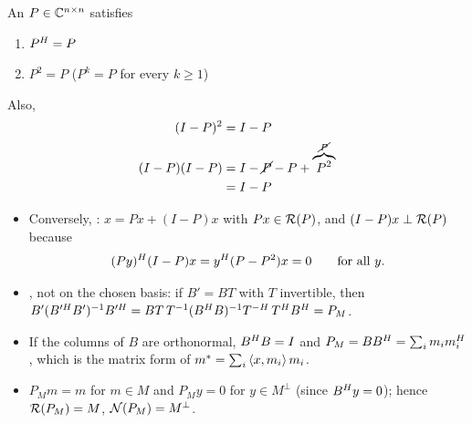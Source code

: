 \begin{remark}
An  $P\in\mathbb{C}^{n\times n}$ satisfies
\begin{enumerate}[label=\roman*-), nosep]
  \item $P^{H} = P$
  \item $P^2 = P$ \quad ($P^k = P$ for every $k\ge 1$)
\end{enumerate}
Also,
\begin{align*}
(I-P)^2 &= I-P\\
(I-P)(I-P) &= I-\cancel{P}-P+\overbrace{P^2}^{\cancel{P}}\\
&= I-P
\end{align*}
\end{remark}
\begin{insight}[Remarks on $P_M$]
\begin{itemize}[nosep]
  \item Conversely, :
        $x = Px + (I-P)x$ with $Px\in\mathcal{R}(P)$, and $(I-P)x\perp\mathcal{R}(P)$ because
        \[
        (Py)^{H}(I-P)x = y^{H}(P-P^2)x = 0 \qquad\text{for all } y.
        \]
  \item {}, not on the chosen basis: if $B' = BT$ with $T$ invertible, then
        $B'(B'^H B')^{-1}B'^H = BT\,T^{-1}(B^{H} B)^{-1}T^{-H}\,T^{H} B^{H} = P_M$.
  \item If the columns of $B$ are orthonormal, $B^{H} B = I$ and $P_M = BB^{H} = \sum_i m_i m_i^{H}$,
        which is the matrix form of $m^* = \sum_i\left\langle x, m_i \right\rangle m_i$.
  \item $P_M m = m$ for $m\in M$ and $P_M y = 0$ for $y\in M^\perp$ (since $B^{H} y = 0$);
        hence $\mathcal{R}(P_M) = M$, $\mathcal{N}(P_M) = M^\perp$.
\end{itemize}
\end{insight}

